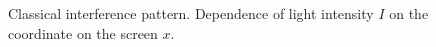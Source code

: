 \begin{figure}
\centering



\caption{Classical interference pattern. Dependence of light intensity $I$ on the coordinate on the screen $x$.}
\label{figPart4Ch2_3}
\end{figure}